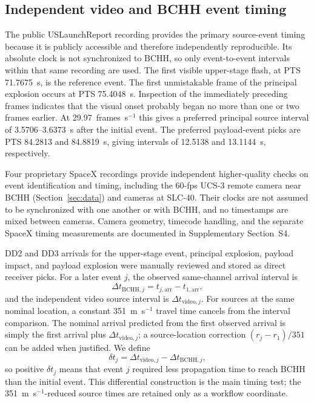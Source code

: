 \documentclass[]{seismica}
\begin{document}
\subsection{Independent video and BCHH event timing}

The public USLaunchReport recording \citep{uslaunchreport_amos6_video_2016}
provides the primary source-event timing because it is publicly accessible
and therefore independently reproducible. Its absolute clock is not
synchronized to BCHH, so only event-to-event intervals within that same
recording are used. The first visible upper-stage flash, at PTS 71.7675~s,
is the reference event. The first unmistakable frame of the principal
explosion occurs at PTS 75.4048~s. Inspection of the immediately preceding
frames indicates that the visual onset probably began no more than one or
two frames earlier. At 29.97~frames~s$^{-1}$ this gives a preferred
principal source interval of 3.5706--3.6373~s after the initial event.
The preferred payload-event picks are PTS 84.2813 and 84.8819~s, giving
intervals of 12.5138 and 13.1144~s, respectively.

Four proprietary SpaceX recordings provide independent higher-quality
checks on event identification and timing, including the 60-fps UCS-3
remote camera near BCHH (Section~\ref{sec:data}) and cameras at SLC-40.
Their clocks are not assumed to be synchronized with one another or with
BCHH, and no timestamps are mixed between cameras. Camera geometry,
timecode handling, and the separate SpaceX timing measurements are
documented in Supplementary Section~S4.

DD2 and DD3 arrivals for the upper-stage event, principal explosion, payload
impact, and payload explosion were manually reviewed and stored as direct
receiver picks. For a later event $j$, the observed same-channel arrival
interval is
\begin{equation}
 \Delta t_{\mathrm{BCHH},j}=t_{j,\mathrm{arr}}-t_{1,\mathrm{arr}},
\end{equation}
and the independent video source interval is
$\Delta t_{\mathrm{video},j}$. For sources at the same nominal location, a
constant 351~m~s$^{-1}$ travel time cancels from the interval comparison. The
nominal arrival predicted from the first observed arrival is simply the first
arrival plus $\Delta t_{\mathrm{video},j}$; a source-location correction
$(r_j-r_1)/351$ can be added when justified. We define
\begin{equation}
 \delta t_j=\Delta t_{\mathrm{video},j}-\Delta t_{\mathrm{BCHH},j},
 \label{eq:differential_advance}
\end{equation}
so positive $\delta t_j$ means that event $j$ required less propagation time
to reach BCHH than the initial event. This differential construction is the
main timing test; the 351~m~s$^{-1}$-reduced source times are retained only as
a workflow coordinate.
\end{document}
